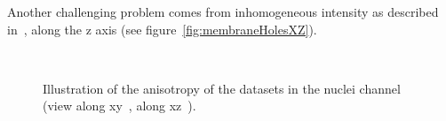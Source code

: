 Another challenging problem comes from inhomogeneous intensity as described in~\cite{umesh2001efficient}, along the z axis (see figure~\ref{fig:membraneHolesXZ}).
\begin{figure}[htb]
  \centering
  \captionsetup[subfloat]{labelformat=empty}
  \\
\caption{%
Illustration of the anisotropy of the datasets in the nuclei channel (view along xy~, along xz~).}
\label{fig:anisotropy}
\end{figure}
